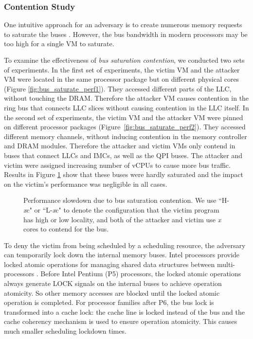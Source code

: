 \documentclass{sig-alternate}
\newcommand{\bheading}[1]{{\vspace{2pt}\noindent{\textbf{#1}}\hspace{2pt}}}
\begin{document}
\subsubsection{Contention Study}

\bheading{Bus saturation.}
One intuitive approach for an adversary is to create numerous memory requests to 
saturate the buses \cite{WoLe:07}. However, the bus bandwidth in modern 
processors may be too high for a single VM to saturate.

To examine the effectiveness of \emph{bus saturation contention}, we conducted two sets of 
experiments. In the first set of
experiments, the victim VM and the attacker VM were located in the
same processor package but on different physical cores (Figure \ref{fig:bus_saturate_perf1}). They accessed
different parts of the LLC, without touching the DRAM. Therefore the
attacker VM causes contention in the ring bus that connects LLC
slices without causing contention in the LLC itself. In the second
set of experiments, the victim VM and the attacker VM were pinned on
different processor packages (Figure~\ref{fig:bus_saturate_perf2}). 
They accessed different memory channels,
without inducing contention in the memory controller and DRAM
modules. Therefore the attacker and victim VMs only contend in buses that
connect LLCs and IMCs, as well as the QPI buses.  The attacker and victim were
assigned increasing number of vCPUs to cause more bus traffic. 
Results in Figure \ref{fig:bus_saturate_perf} show that these buses 
were hardly saturated and the impact on the victim's performance was negligible
in all cases.



\begin{figure}[t]
     \centering
    \caption[The LOF caption]{Performance slowdown due to bus saturation contention. We use
``H-\emph{x}c" or ``L-\emph{x}c" to denote the configuration that the
victim program has high or low locality, and both of the attacker and victim use \emph{x} cores to contend for the bus.}
    \label{fig:bus_saturate_perf}
\end{figure}


\bheading{Bus locking.}
To deny the victim from being scheduled by a scheduling resource, the adversary 
can temporarily lock down the internal memory buses. 
Intel processors provide locked atomic operations for managing shared data 
structures between multi-processors \cite{intel_manual}. Before Intel Pentium (P5) 
processors, the locked atomic operations always generate LOCK signals on the 
internal buses to achieve operation atomicity. So other memory accesses are blocked
until the locked atomic operation is completed. For processor families after P6, 
the bus lock is transformed into a cache lock: the cache line is locked instead
of the bus and the cache coherency mechanism is used to ensure operation atomicity.
This causes much smaller scheduling lockdown times.
\end{document}
